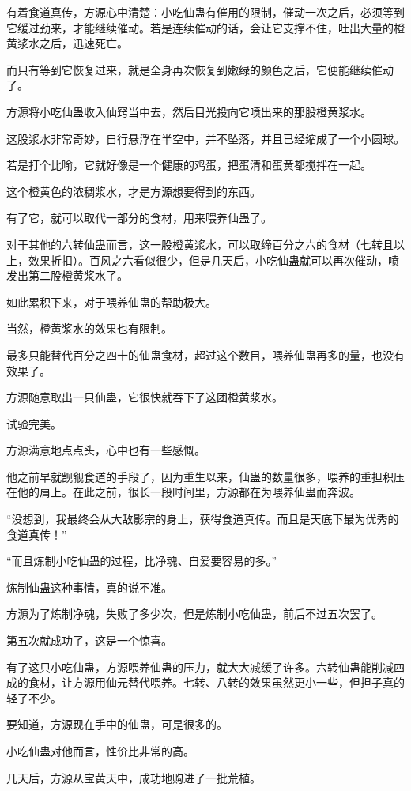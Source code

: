 \begin{this_body}
有着食道真传，方源心中清楚：小吃仙蛊有催用的限制，催动一次之后，必须等到它缓过劲来，才能继续催动。若是连续催动的话，会让它支撑不住，吐出大量的橙黄浆水之后，迅速死亡。

而只有等到它恢复过来，就是全身再次恢复到嫩绿的颜色之后，它便能继续催动了。

方源将小吃仙蛊收入仙窍当中去，然后目光投向它喷出来的那股橙黄浆水。

这股浆水非常奇妙，自行悬浮在半空中，并不坠落，并且已经缩成了一个小圆球。

若是打个比喻，它就好像是一个健康的鸡蛋，把蛋清和蛋黄都搅拌在一起。

这个橙黄色的浓稠浆水，才是方源想要得到的东西。

有了它，就可以取代一部分的食材，用来喂养仙蛊了。

对于其他的六转仙蛊而言，这一股橙黄浆水，可以取缔百分之六的食材（七转且以上，效果折扣）。百风之六看似很少，但是几天后，小吃仙蛊就可以再次催动，喷发出第二股橙黄浆水了。

如此累积下来，对于喂养仙蛊的帮助极大。

当然，橙黄浆水的效果也有限制。

最多只能替代百分之四十的仙蛊食材，超过这个数目，喂养仙蛊再多的量，也没有效果了。

方源随意取出一只仙蛊，它很快就吞下了这团橙黄浆水。

试验完美。

方源满意地点点头，心中也有一些感慨。

他之前早就觊觎食道的手段了，因为重生以来，仙蛊的数量很多，喂养的重担积压在他的肩上。在此之前，很长一段时间里，方源都在为喂养仙蛊而奔波。

“没想到，我最终会从大敌影宗的身上，获得食道真传。而且是天底下最为优秀的食道真传！”

“而且炼制小吃仙蛊的过程，比净魂、自爱要容易的多。”

炼制仙蛊这种事情，真的说不准。

方源为了炼制净魂，失败了多少次，但是炼制小吃仙蛊，前后不过五次罢了。

第五次就成功了，这是一个惊喜。

有了这只小吃仙蛊，方源喂养仙蛊的压力，就大大减缓了许多。六转仙蛊能削减四成的食材，让方源用仙元替代喂养。七转、八转的效果虽然更小一些，但担子真的轻了不少。

要知道，方源现在手中的仙蛊，可是很多的。

小吃仙蛊对他而言，性价比非常的高。

几天后，方源从宝黄天中，成功地购进了一批荒植。


\end{this_body}
